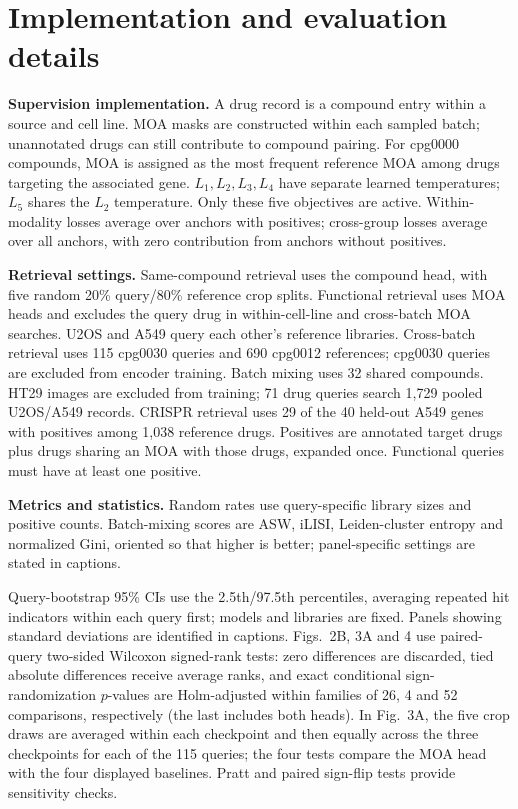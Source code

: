 \section{Implementation and evaluation details}\label{app:protocol}
\textbf{Supervision implementation.} A drug record is a compound entry within a source and cell line. MOA masks are constructed within each sampled batch; unannotated drugs can still contribute to compound pairing. For cpg0000 compounds, MOA is assigned as the most frequent reference MOA among drugs targeting the associated gene. $L_1,L_2,L_3,L_4$ have separate learned temperatures; $L_5$ shares the $L_2$ temperature. Only these five objectives are active. Within-modality losses average over anchors with positives; cross-group losses average over all anchors, with zero contribution from anchors without positives.

\textbf{Retrieval settings.} Same-compound retrieval uses the compound head, with five random 20\% query/80\% reference crop splits. Functional retrieval uses MOA heads and excludes the query drug in within-cell-line and cross-batch MOA searches. U2OS and A549 query each other's reference libraries. Cross-batch retrieval uses 115 cpg0030 queries and 690 cpg0012 references; cpg0030 queries are excluded from encoder training. Batch mixing uses 32 shared compounds. HT29 images are excluded from training; 71 drug queries search 1,729 pooled U2OS/A549 records. CRISPR retrieval uses 29 of the 40 held-out A549 genes with positives among 1,038 reference drugs. Positives are annotated target drugs plus drugs sharing an MOA with those drugs, expanded once. Functional queries must have at least one positive.

\textbf{Metrics and statistics.} Random rates use query-specific library sizes and positive counts. Batch-mixing scores are ASW, iLISI, Leiden-cluster entropy and normalized Gini, oriented so that higher is better; panel-specific settings are stated in captions.

Query-bootstrap 95\% CIs use the 2.5th/97.5th percentiles, averaging repeated hit indicators within each query first; models and libraries are fixed. Panels showing standard deviations are identified in captions. Figs.~2B, 3A and 4 use paired-query two-sided Wilcoxon signed-rank tests: zero differences are discarded, tied absolute differences receive average ranks, and exact conditional sign-randomization $p$-values are Holm-adjusted within families of 26, 4 and 52 comparisons, respectively (the last includes both heads). In Fig.~3A, the five crop draws are averaged within each checkpoint and then equally across the three checkpoints for each of the 115 queries; the four tests compare the MOA head with the four displayed baselines. Pratt and paired sign-flip tests provide sensitivity checks.

